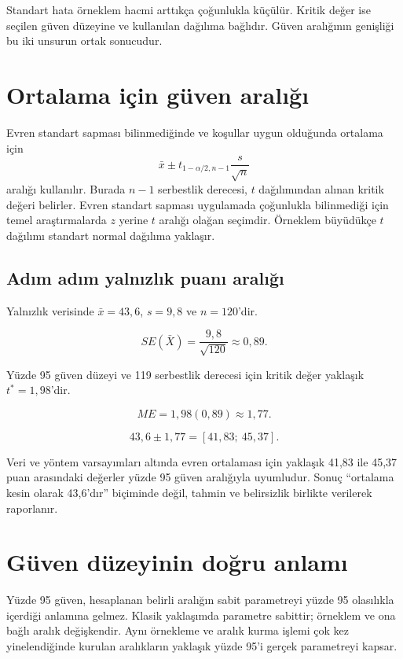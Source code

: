 Standart hata örneklem hacmi arttıkça çoğunlukla küçülür. Kritik değer ise
seçilen güven düzeyine ve kullanılan dağılıma bağlıdır. Güven aralığının
genişliği bu iki unsurun ortak sonucudur.

\section{Ortalama için güven aralığı}

Evren standart sapması bilinmediğinde ve koşullar uygun olduğunda ortalama
için
\[
\bar x\pm t_{1-\alpha/2,n-1}\frac{s}{\sqrt n}
\]
aralığı kullanılır. Burada $n-1$ serbestlik derecesi, $t$ dağılımından alınan
kritik değeri belirler. Evren standart sapması uygulamada çoğunlukla
bilinmediği için temel araştırmalarda $z$ yerine $t$ aralığı olağan seçimdir.
Örneklem büyüdükçe $t$ dağılımı standart normal dağılıma yaklaşır.

\subsection{Adım adım yalnızlık puanı aralığı}

Yalnızlık verisinde $\bar x=43{,}6$, $s=9{,}8$ ve $n=120$'dir.

\[
SE(\bar X)=\frac{9{,}8}{\sqrt{120}}\approx0{,}89.
\]


Yüzde 95 güven düzeyi ve 119 serbestlik derecesi için kritik değer yaklaşık
$t^*=1{,}98$'dir.

\[
ME=1{,}98(0{,}89)\approx1{,}77.
\]

\[
43{,}6\pm1{,}77=[41{,}83;\ 45{,}37].
\]

Veri ve yöntem varsayımları altında evren ortalaması için yaklaşık 41,83 ile
45,37 puan arasındaki değerler yüzde 95 güven aralığıyla uyumludur. Sonuç
``ortalama kesin olarak 43,6'dır'' biçiminde değil, tahmin ve belirsizlik
birlikte verilerek raporlanır.

\section{Güven düzeyinin doğru anlamı}

Yüzde 95 güven, hesaplanan belirli aralığın sabit parametreyi yüzde 95
olasılıkla içerdiği anlamına gelmez. Klasik yaklaşımda parametre sabittir;
örneklem ve ona bağlı aralık değişkendir. Aynı örnekleme ve aralık kurma
işlemi çok kez yinelendiğinde kurulan aralıkların yaklaşık yüzde 95'i gerçek
parametreyi kapsar.

